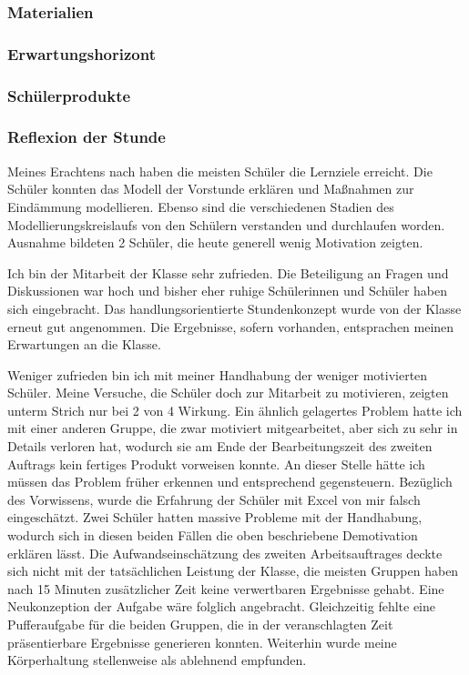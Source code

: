 \subsubsection{Materialien}
\subsubsection{Erwartungshorizont}
\subsubsection{Schülerprodukte}
\subsubsection{Reflexion der Stunde}
Meines Erachtens nach haben die meisten Schüler die Lernziele erreicht. Die Schüler konnten das Modell der Vorstunde erklären und Maßnahmen zur Eindämmung modellieren. Ebenso sind die verschiedenen Stadien des Modellierungskreislaufs von den Schülern verstanden und durchlaufen worden. Ausnahme bildeten 2 Schüler, die heute generell wenig Motivation zeigten. 

Ich bin der Mitarbeit der Klasse sehr zufrieden. Die Beteiligung an Fragen und Diskussionen war hoch und bisher eher ruhige Schülerinnen und Schüler haben sich eingebracht. Das handlungsorientierte Stundenkonzept wurde von der Klasse erneut gut angenommen. Die Ergebnisse, sofern vorhanden, entsprachen meinen Erwartungen an die Klasse.

Weniger zufrieden bin ich mit meiner Handhabung der weniger motivierten Schüler. Meine Versuche, die Schüler doch zur Mitarbeit zu motivieren, zeigten unterm Strich nur bei 2 von 4 Wirkung. Ein ähnlich gelagertes Problem hatte ich mit einer anderen Gruppe, die zwar motiviert mitgearbeitet, aber sich zu sehr in Details verloren hat, wodurch sie am Ende der Bearbeitungszeit des zweiten Auftrags kein fertiges Produkt vorweisen konnte. An dieser Stelle hätte ich müssen das Problem früher erkennen und entsprechend gegensteuern. Bezüglich des Vorwissens, wurde die Erfahrung der Schüler mit Excel von mir falsch eingeschätzt. Zwei Schüler hatten massive Probleme mit der Handhabung, wodurch sich in diesen beiden Fällen die oben beschriebene Demotivation erklären lässt. Die Aufwandseinschätzung des zweiten Arbeitsauftrages deckte sich nicht mit der tatsächlichen Leistung der Klasse, die meisten Gruppen haben nach 15 Minuten zusätzlicher Zeit keine verwertbaren Ergebnisse gehabt. Eine Neukonzeption der Aufgabe wäre folglich angebracht. Gleichzeitig fehlte eine Pufferaufgabe für die beiden Gruppen, die in der veranschlagten Zeit präsentierbare Ergebnisse generieren konnten. Weiterhin wurde meine Körperhaltung stellenweise als ablehnend empfunden. 

